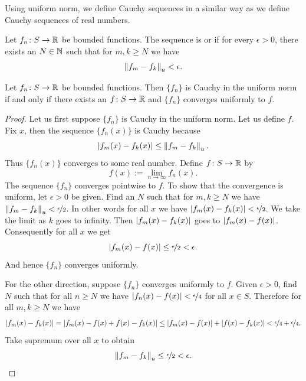 Using uniform norm, we define Cauchy sequences in a similar way
as we define Cauchy sequences of real numbers.

\begin{defn}
Let $f_n \colon S \to {\mathbb{R}}$ be bounded functions.
The sequence is \emph{}
or \emph{}
if for every $\epsilon > 0$, there exists an $N \in {\mathbb{N}}$ such
that for $m,k \geq N$ we have
\begin{equation*}
\left\lVert {f_m-f_k} \right\rVert_u < \epsilon .
\end{equation*}
\end{defn}

\begin{prop} \label{prop:uniformcauchy}
Let $f_n \colon S \to {\mathbb{R}}$ be bounded functions.
Then $\{ f_n \}$ is Cauchy in the uniform norm if and only if
there exists an $f \colon S \to {\mathbb{R}}$ and $\{ f_n \}$ converges
uniformly to $f$.
\end{prop}

\begin{proof}
Let us first suppose $\{ f_n \}$ is Cauchy in the uniform norm.
Let us define $f$.  Fix $x$, then
the sequence $\{ f_n(x) \}$ is Cauchy because
\begin{equation*}
\left\lvert {f_m(x)-f_k(x)} \right\rvert
\leq
\left\lVert {f_m-f_k} \right\rVert_u .
\end{equation*}
Thus $\{ f_n(x) \}$ converges to some real number.  Define $f \colon S
\to {\mathbb{R}}$ by
\begin{equation*}
f(x) := \lim_{n \to \infty} f_n(x) .
\end{equation*}
The sequence
$\{ f_n \}$ converges pointwise to $f$.  To show that the convergence
is uniform, let $\epsilon > 0$ be given.  Find an $N$ such that
for $m, k \geq N$ we have
$\left\lVert {f_m-f_k} \right\rVert_u < \nicefrac{\epsilon}{2}$.  In other words for
all $x$ we have
$\left\lvert {f_m(x)-f_k(x)} \right\rvert < \nicefrac{\epsilon}{2}$.  We take the limit
as $k$ goes to infinity.  Then $\left\lvert {f_m(x)-f_k(x)} \right\rvert$
goes to $\left\lvert {f_m(x)-f(x)} \right\rvert$.
Consequently for all $x$ we get
\begin{equation*}
\left\lvert {f_m(x)-f(x)} \right\rvert \leq \nicefrac{\epsilon}{2} < \epsilon .
\end{equation*}
And hence $\{ f_n \}$ converges uniformly.

For the other direction, suppose $\{ f_n \}$ converges uniformly to
$f$.  Given $\epsilon > 0$, find $N$ such that for all $n \geq N$
we have $\left\lvert {f_n(x)-f(x)} \right\rvert < \nicefrac{\epsilon}{4}$ for all $x \in S$.
Therefore for all $m, k \geq N$ we have
\begin{equation*}
\left\lvert {f_m(x)-f_k(x)} \right\rvert = 
\left\lvert {f_m(x)-f(x)+f(x)-f_k(x)} \right\rvert \leq
\left\lvert {f_m(x)-f(x)} \right\rvert+\left\lvert {f(x)-f_k(x)} \right\rvert < \nicefrac{\epsilon}{4} +
\nicefrac{\epsilon}{4} .
\end{equation*}
Take supremum over all $x$ to obtain
\begin{equation*}
\left\lVert {f_m-f_k} \right\rVert_u \leq \nicefrac{\epsilon}{2} < \epsilon .  \qedhere
\end{equation*}
\end{proof}

